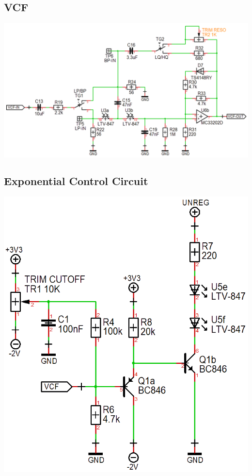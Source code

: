 \documentclass{scrartcl}
\begin{document}
\subsection{VCF}

\begin{center}
    \includegraphics[scale=0.39]{assets/schema-vcf.png}
\end{center}

\subsection{Exponential Control Circuit}

\begin{center}
    \includegraphics[scale=0.42]{assets/schema-expo.png}
\end{center}
\end{document}
